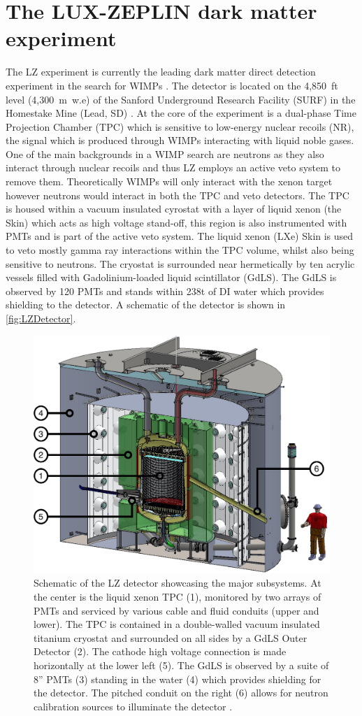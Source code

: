 \chapter{The LUX-ZEPLIN dark matter experiment}\label{chap:LZExperiment}
The LZ experiment is currently the leading dark matter direct detection experiment in the search for WIMPs \cite{LZ:2024zvo}. The detector is located on the 4,850~ft level (4,300~m~w.e) of the Sanford Underground Research Facility (SURF) in the Homestake Mine (Lead, SD) \cite{LZNIMA}. At the core of the experiment is a dual-phase Time Projection Chamber (TPC) which is sensitive to low-energy nuclear recoils (NR), the signal which is produced through WIMPs interacting with liquid noble gases. One of the main backgrounds in a WIMP search are neutrons as they also interact through nuclear recoils and thus LZ employs an active veto system to remove them. Theoretically WIMPs will only interact with the xenon target however neutrons would interact in both the TPC and veto detectors. The TPC is housed within a vacuum insulated cyrostat with a layer of liquid xenon (the Skin) which acts as high voltage stand-off, this region is also instrumented with PMTs and is part of the active veto system. The liquid xenon (LXe) Skin is used to veto mostly gamma ray interactions within the TPC volume, whilst also being sensitive to neutrons. The cryostat is surrounded near hermetically by ten acrylic vessels filled with Gadolinium-loaded liquid scintillator (GdLS). The GdLS is observed by 120 PMTs and stands within 238t of DI water which provides shielding to the detector. A schematic of the detector is shown in \autoref{fig:LZDetector}.
\begin{figure}[ht!]
    \centering
    \includegraphics[width=0.7\linewidth]{figures/LZ/LZSchematic.pdf}
    \caption{Schematic of the LZ detector showcasing the major subsystems. At the center is the liquid xenon TPC (1), monitored by two arrays of PMTs and serviced by various cable and fluid conduits (upper and lower). The TPC is contained in a double-walled vacuum insulated titanium cryostat and surrounded on all sides by a GdLS Outer Detector (2). The cathode high voltage connection is made horizontally at the lower left (5). The GdLS is observed by a suite of 8” PMTs (3) standing in the water (4) which provides shielding for the detector. The pitched conduit on the right (6) allows for neutron calibration sources to illuminate the detector \cite{LZNIMA}.}
    \label{fig:LZDetector}
\end{figure}
